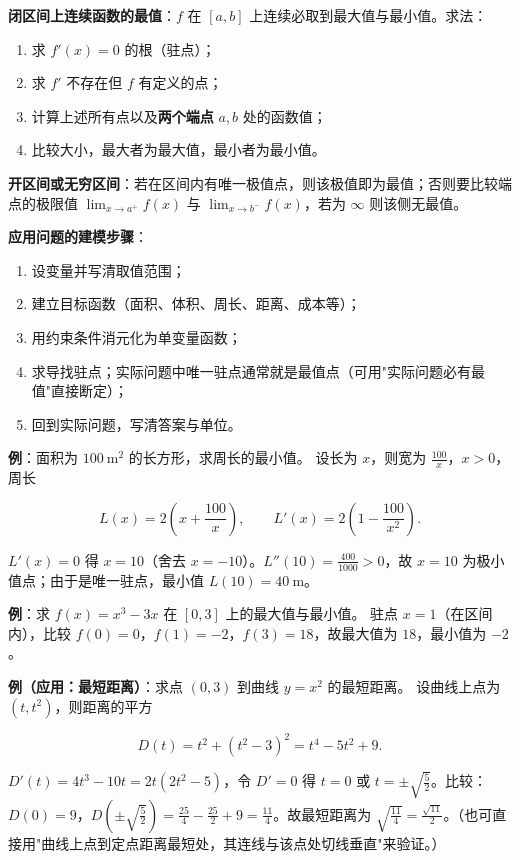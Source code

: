 \documentclass[11pt,openany,UTF8]{ctexbook}
\begin{document}
\textbf{闭区间上连续函数的最值}：$f$ 在 $[a,b]$ 上连续必取到最大值与最小值。求法：

\begin{enumerate}
\item 求 $f'(x)=0$ 的根（驻点）；
\item 求 $f'$ 不存在但 $f$ 有定义的点；
\item 计算上述所有点以及\textbf{两个端点} $a,b$ 处的函数值；
\item 比较大小，最大者为最大值，最小者为最小值。
\end{enumerate}
\textbf{开区间或无穷区间}：若在区间内有唯一极值点，则该极值即为最值；否则要比较端点的极限值 $\lim_{x\to a^+}f(x)$ 与 $\lim_{x\to b^-}f(x)$，若为 $\infty$ 则该侧无最值。

\textbf{应用问题的建模步骤}：

\begin{enumerate}
\item 设变量并写清取值范围；
\item 建立目标函数（面积、体积、周长、距离、成本等）；
\item 用约束条件消元化为单变量函数；
\item 求导找驻点；实际问题中唯一驻点通常就是最值点（可用"实际问题必有最值"直接断定）；
\item 回到实际问题，写清答案与单位。
\end{enumerate}
\textbf{例}：面积为 $100\ \mathrm{m}^2$ 的长方形，求周长的最小值。 设长为 $x$，则宽为 $\frac{100}{x}$，$x>0$，周长

\[L(x)=2\left(x+\frac{100}{x}\right),\qquad L'(x)=2\left(1-\frac{100}{x^2}\right).\]

$L'(x)=0$ 得 $x=10$（舍去 $x=-10$）。$L''(10)=\frac{400}{1000}>0$，故 $x=10$ 为极小值点；由于是唯一驻点，最小值 $L(10)=40\ \mathrm{m}$。

\textbf{例}：求 $f(x)=x^3-3x$ 在 $[0,3]$ 上的最大值与最小值。 驻点 $x=1$（在区间内），比较 $f(0)=0$，$f(1)=-2$，$f(3)=18$，故最大值为 $18$，最小值为 $-2$。

\textbf{例（应用：最短距离）}：求点 $(0,3)$ 到曲线 $y=x^2$ 的最短距离。 设曲线上点为 $(t,t^2)$，则距离的平方

\[D(t)=t^2+(t^2-3)^2=t^4-5t^2+9 .\]

$D'(t)=4t^3-10t=2t(2t^2-5)$，令 $D'=0$ 得 $t=0$ 或 $t=\pm\sqrt{\frac52}$。比较：$D(0)=9$，$D\!\left(\pm\sqrt{\frac52}\right)=\frac{25}{4}-\frac{25}{2}+9=\frac{11}{4}$。故最短距离为 $\sqrt{\frac{11}{4}}=\frac{\sqrt{11}}{2}$。（也可直接用"曲线上点到定点距离最短处，其连线与该点处切线垂直"来验证。）
\end{document}
